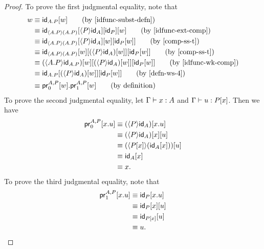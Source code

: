 \begin{proof}
To prove the first judgmental equality, note that
\begin{align*}
w & \jdeq \subst{w}{\idfunc[\ctxext{A}{P}]} \tag{by \autoref{idfunc-subst-defn}}\\
& \jdeq \subst{w}{\subst{\idfunc[P]}{{\ctxwk{P}{\idfunc[A]}}{\idfunc[\ctxwk{\ctxext{A}{P}}{\ctxext{A}{P}}]}}}
  \tag{by \autoref{idfunc-ext-comp}}\\
& \jdeq \subst{{w}{\idfunc[P]}}{\subst{w}{{\ctxwk{P}{\idfunc[A]}}{\idfunc[\ctxwk{\ctxext{A}{P}}{\ctxext{A}{P}}]}}}\tag{by \autoref{comp-ss-t}}\\
& \jdeq \subst{{w}{\idfunc[P]}}{{\subst{w}{\ctxwk{P}{\idfunc[A]}}}{\subst{w}{\idfunc[\ctxwk{\ctxext{A}{P}}{\ctxext{A}{P}}]}}}\tag{by \autoref{comp-ss-t}}\\
& \jdeq \subst{{w}{\idfunc[P]}}{{\subst{w}{\ctxwk{P}{\idfunc[A]}}}{\subst{w}{\ctxwk{\ctxext{A}{P}}{\idfunc[\ctxext{A}{P}]}}}}\tag{by \autoref{idfunc-wk-comp}}\\
& \jdeq \subst{{w}{\idfunc[P]}}{{\subst{w}{\ctxwk{P}{\idfunc[A]}}}{\idfunc[\ctxext{A}{P}]}}\tag{by \autoref{defn-ws-4}}\\
& \jdeq \tmext{A}{P}{\cprojfst{A}{P}{w}}{\cprojsnd{A}{P}{w}}\tag{by definition}
\end{align*}
To prove the second judgmental equality, let $\jterm{\Gamma}{A}{x}$ and
$\jterm{\Gamma}{\subst{x}{P}}{u}$. Then we have
\begin{align*}
\cprojfst{A}{P}{\tmext{A}{P}{x}{u}}
& \jdeq \subst{\tmext{A}{P}{x}{u}}{\ctxwk{P}{\idfunc[A]}}\\
& \jdeq \subst{u}{{x}{\ctxwk{P}{\idfunc[A]}}} \\
& \jdeq \subst{u}{\ctxwk{\subst{x}{P}}{\subst{x}{\idfunc[A]}}}\\
& \jdeq \subst{x}{\idfunc[A]}\\
& \jdeq x.
\end{align*}
To prove the third judgmental equality, note that
\begin{align*}
\cprojsnd{A}{P}{\tmext{A}{P}{x}{u}}
& \jdeq \subst{\tmext{A}{P}{x}{u}}{\idfunc[P]}\\
& \jdeq \subst{u}{{x}{\idfunc[P]}}\\
& \jdeq \subst{u}{\idfunc[\subst{x}{P}]}\\
& \jdeq u.
\end{align*}
\end{proof}

